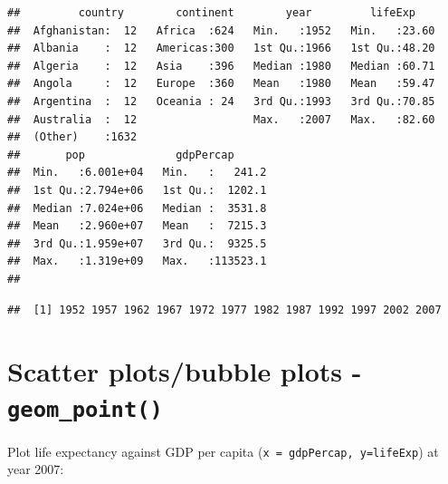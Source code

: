 \documentclass[]{book}
\makeatletter
\newenvironment{Shaded}{\begin{snugshade}}{\end{snugshade}}
\newcommand{\KeywordTok}[1]{\textcolor[rgb]{0.13,0.29,0.53}{\textbf{#1}}}
\newcommand{\DataTypeTok}[1]{\textcolor[rgb]{0.13,0.29,0.53}{#1}}
\newcommand{\DecValTok}[1]{\textcolor[rgb]{0.00,0.00,0.81}{#1}}
\newcommand{\StringTok}[1]{\textcolor[rgb]{0.31,0.60,0.02}{#1}}
\newcommand{\OperatorTok}[1]{\textcolor[rgb]{0.81,0.36,0.00}{\textbf{#1}}}
\newcommand{\NormalTok}[1]{#1}
\newenvironment{kframe}{%
\medskip{}
\setlength{\fboxsep}{.8em}
 \def\at@end@of@kframe{}%
 \ifinner\ifhmode%
  \def\at@end@of@kframe{\end{minipage}}%
  \begin{minipage}{\columnwidth}%
 \fi\fi%
 \def\FrameCommand##1{\hskip\@totalleftmargin \hskip-\fboxsep
 \colorbox{shadecolor}{##1}\hskip-\fboxsep
     \hskip-\linewidth \hskip-\@totalleftmargin \hskip\columnwidth}%
 \MakeFramed {\advance\hsize-\width
   \@totalleftmargin\z@ \linewidth\hsize
   \@setminipage}}%
 {\par\unskip\endMakeFramed%
 \at@end@of@kframe}
\renewenvironment{Shaded}{\begin{kframe}}{\end{kframe}}
\makeatother
\begin{document}
\begin{verbatim}
##         country        continent        year         lifeExp     
##  Afghanistan:  12   Africa  :624   Min.   :1952   Min.   :23.60  
##  Albania    :  12   Americas:300   1st Qu.:1966   1st Qu.:48.20  
##  Algeria    :  12   Asia    :396   Median :1980   Median :60.71  
##  Angola     :  12   Europe  :360   Mean   :1980   Mean   :59.47  
##  Argentina  :  12   Oceania : 24   3rd Qu.:1993   3rd Qu.:70.85  
##  Australia  :  12                  Max.   :2007   Max.   :82.60  
##  (Other)    :1632                                                
##       pop              gdpPercap       
##  Min.   :6.001e+04   Min.   :   241.2  
##  1st Qu.:2.794e+06   1st Qu.:  1202.1  
##  Median :7.024e+06   Median :  3531.8  
##  Mean   :2.960e+07   Mean   :  7215.3  
##  3rd Qu.:1.959e+07   3rd Qu.:  9325.5  
##  Max.   :1.319e+09   Max.   :113523.1  
## 
\end{verbatim}

\begin{Shaded}
\end{Shaded}

\begin{verbatim}
##  [1] 1952 1957 1962 1967 1972 1977 1982 1987 1992 1997 2002 2007
\end{verbatim}

\section{\texorpdfstring{Scatter plots/bubble plots -
\texttt{geom\_point()}}{Scatter plots/bubble plots - geom\_point()}}\label{scatter-plotsbubble-plots---geom_point}

Plot life expectancy against GDP per capita
(\texttt{x\ =\ gdpPercap,\ y=lifeExp}) at year 2007:

\begin{Shaded}
\end{Shaded}
\end{document}
